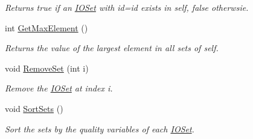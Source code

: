 \begin{DoxyCompactItemize}
\begin{DoxyCompactList}\small\item\em Returns true if an \hyperlink{class_i_o_set}{IOSet} with id=id exists in self, false otherwsie. \item\end{DoxyCompactList}\item 
\hypertarget{class_n_cluster_a35ad64188494aec6b0b5a255217ba11b}{
int \hyperlink{class_n_cluster_a35ad64188494aec6b0b5a255217ba11b}{GetMaxElement} ()}
\label{class_n_cluster_a35ad64188494aec6b0b5a255217ba11b}

\begin{DoxyCompactList}\small\item\em Returns the value of the largest element in all sets of self. \item\end{DoxyCompactList}\item 
\hypertarget{class_n_cluster_a3cea2ce61b20d00b751041984660eba5}{
void \hyperlink{class_n_cluster_a3cea2ce61b20d00b751041984660eba5}{RemoveSet} (int i)}
\label{class_n_cluster_a3cea2ce61b20d00b751041984660eba5}

\begin{DoxyCompactList}\small\item\em Remove the \hyperlink{class_i_o_set}{IOSet} at index i. \item\end{DoxyCompactList}\item 
\hypertarget{class_n_cluster_a977c14300769c0146dbb5b0fa8773a08}{
void \hyperlink{class_n_cluster_a977c14300769c0146dbb5b0fa8773a08}{SortSets} ()}
\label{class_n_cluster_a977c14300769c0146dbb5b0fa8773a08}

\begin{DoxyCompactList}\small\item\em Sort the sets by the quality variables of each \hyperlink{class_i_o_set}{IOSet}. \item\end{DoxyCompactList}\end{DoxyCompactItemize}
